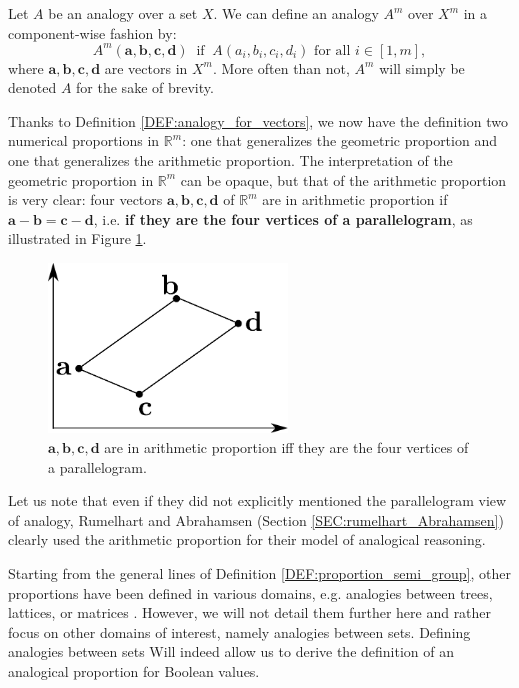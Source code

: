 \begin{definition}
  \label{DEF:analogy_for_vectors}
  Let $A$ be an analogy over a set $X$. We can define an analogy $A^m$ over
  $X^m$ in a component-wise fashion by:
  $$A^m(\mathbf{a}, \mathbf{b}, \mathbf{c}, \mathbf{d}) ~ \text{  if  } ~
  A(a_i, b_i, c_i, d_i) \text{ for all } i \in [1, m],$$
  where $\mathbf{a}, \mathbf{b}, \mathbf{c}, \mathbf{d}$ are vectors in $X^m$.
  More often than not, $A^m$ will simply be denoted $A$ for the sake of
  brevity.
\end{definition}
\noindent
Thanks to Definition \ref{DEF:analogy_for_vectors}, we now have the definition
two numerical proportions in $\mathbb{R}^m$: one that generalizes the geometric
proportion and one that generalizes the arithmetic proportion.  The
interpretation of the geometric proportion in $\mathbb{R}^m$ can be opaque, but
that of the arithmetic proportion is very clear: four vectors $\mathbf{a},
\mathbf{b}, \mathbf{c}, \mathbf{d}$ of $\mathbb{R}^m$ are in arithmetic
proportion if $\mathbf{a} - \mathbf{b} = \mathbf{c} - \mathbf{d}$, i.e.
\textbf{if they are the four vertices of a parallelogram}, as illustrated in
Figure \ref{FIG:arithmetic_proportion}.
\begin{figure}[!h]
\centering
  \includegraphics[width=2.5in]{figures/arithmetic_proportion.pdf}
  \caption{$\mathbf{a}, \mathbf{b}, \mathbf{c}, \mathbf{d}$
  are in arithmetic proportion iff they are the four vertices of a
  parallelogram.}
\label{FIG:arithmetic_proportion}
\end{figure}

Let us note that even if they did not explicitly mentioned the parallelogram
view of analogy, Rumelhart and Abrahamsen (Section
\ref{SEC:rumelhart_Abrahamsen}) clearly used the arithmetic proportion for
their model of analogical reasoning.

Starting from the general lines of Definition \ref{DEF:proportion_semi_group},
other proportions have been defined in various domains, e.g. analogies
between trees, lattices, or matrices \cite{MicDel04, StrYvoREPORT05,
MicBayDelJAIR08}. However, we will not detail them further here and rather
focus on other domains of interest, namely analogies between sets. Defining
analogies between sets Will indeed allow us to derive the definition of an
analogical proportion for Boolean values.

